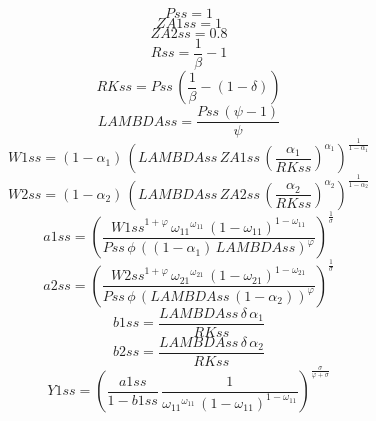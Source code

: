 \begin{dmath*}
Pss = 1
\end{dmath*}
\begin{dmath*}
ZA1ss = 1
\end{dmath*}
\begin{dmath*}
ZA2ss = 0.8
\end{dmath*}
\begin{dmath*}
Rss = \frac{1}{{{\beta}}}-1
\end{dmath*}
\begin{dmath*}
RKss = {Pss}\, \left(\frac{1}{{{\beta}}}-\left(1-{{\delta}}\right)\right)
\end{dmath*}
\begin{dmath*}
LAMBDAss = \frac{{Pss}\, \left({{\psi}}-1\right)}{{{\psi}}}
\end{dmath*}
\begin{dmath*}
W1ss = \left(1-{{\alpha_{1}}}\right)\, \left({LAMBDAss}\, {ZA1ss}\, \left(\frac{{{\alpha_{1}}}}{{RKss}}\right)^{{{\alpha_{1}}}}\right)^{\frac{1}{1-{{\alpha_{1}}}}}
\end{dmath*}
\begin{dmath*}
W2ss = \left(1-{{\alpha_{2}}}\right)\, \left({LAMBDAss}\, {ZA2ss}\, \left(\frac{{{\alpha_{2}}}}{{RKss}}\right)^{{{\alpha_{2}}}}\right)^{\frac{1}{1-{{\alpha_{2}}}}}
\end{dmath*}
\begin{dmath*}
a1ss = \left(\frac{{W1ss}^{1+{{\varphi}}}\, {{\omega_{11}}}^{{{\omega_{11}}}}\, \left(1-{{\omega_{11}}}\right)^{1-{{\omega_{11}}}}}{{Pss}\, {{\phi}}\, \left(\left(1-{{\alpha_{1}}}\right)\, {LAMBDAss}\right)^{{{\varphi}}}}\right)^{\frac{1}{{{\sigma}}}}
\end{dmath*}
\begin{dmath*}
a2ss = \left(\frac{{W2ss}^{1+{{\varphi}}}\, {{\omega_{21}}}^{{{\omega_{21}}}}\, \left(1-{{\omega_{21}}}\right)^{1-{{\omega_{21}}}}}{{Pss}\, {{\phi}}\, \left({LAMBDAss}\, \left(1-{{\alpha_{2}}}\right)\right)^{{{\varphi}}}}\right)^{\frac{1}{{{\sigma}}}}
\end{dmath*}
\begin{dmath*}
b1ss = \frac{{LAMBDAss}\, {{\delta}}\, {{\alpha_{1}}}}{{RKss}}
\end{dmath*}
\begin{dmath*}
b2ss = \frac{{LAMBDAss}\, {{\delta}}\, {{\alpha_{2}}}}{{RKss}}
\end{dmath*}
\begin{dmath*}
Y1ss = \left(\frac{{a1ss}}{1-{b1ss}}\, \frac{1}{{{\omega_{11}}}^{{{\omega_{11}}}}\, \left(1-{{\omega_{11}}}\right)^{1-{{\omega_{11}}}}}\right)^{\frac{{{\sigma}}}{{{\varphi}}+{{\sigma}}}}
\end{dmath*}
